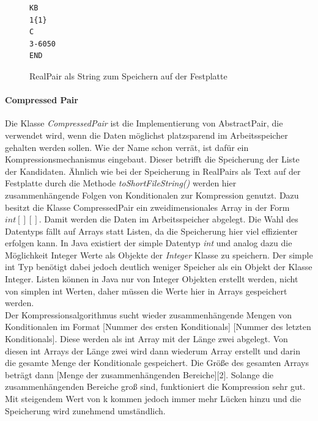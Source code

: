 \documentclass[12pt,a4paper]{article}
\begin{document}
\begin{figure}
\begin{lstlisting}
KB
1{1}
C
3-6050
END
\end{lstlisting}
\caption{RealPair als String zum Speichern auf der Festplatte}
\label{code:pair-text}
\end{figure} 




\paragraph{Compressed Pair}\mbox{}

Die Klasse \textit{CompressedPair} ist die Implementierung von AbstractPair, die verwendet wird, wenn die Daten möglichst platzsparend im Arbeitsspeicher gehalten werden sollen. Wie der Name schon verrät, ist dafür ein Kompressionsmechanismus eingebaut. Dieser betrifft die Speicherung der Liste der Kandidaten. Ähnlich wie bei der Speicherung in RealPairs als Text auf der Festplatte durch die Methode \textit{toShortFileString()} werden hier zusammenhängende Folgen von Konditionalen zur Kompression genutzt. Dazu besitzt die Klasse CompressedPair ein zweidimensionales Array in der Form $int[][]$. Damit werden die Daten im Arbeitsspeicher abgelegt. Die Wahl des Datentyps fällt auf Arrays statt Listen, da die Speicherung hier viel effizienter erfolgen kann. In Java existiert der simple Datentyp \textit{int} und analog dazu die Möglichkeit Integer Werte als Objekte der \textit{Integer} Klasse zu speichern. Der simple int Typ benötigt dabei jedoch deutlich weniger Speicher als ein Objekt der Klasse Integer. Listen können in Java nur von Integer Objekten erstellt werden, nicht von simplen int Werten, daher müssen die Werte hier in Arrays gespeichert werden.\\
Der Kompressionsalgorithmus sucht wieder zusammenhängende Mengen von Konditionalen im Format [Nummer des ersten Konditionals] [Nummer des letzten Konditionals]. Diese werden als int Array mit der Länge zwei abgelegt. Von diesen int Arrays der Länge zwei wird dann wiederum Array erstellt und darin die gesamte Menge der Konditionale gespeichert. Die Größe des gesamten Arrays beträgt dann [Menge der zusammenhängenden Bereiche][2]. Solange die zusammenhängenden Bereiche groß sind, funktioniert die Kompression sehr gut. Mit steigendem Wert von k kommen jedoch immer mehr Lücken hinzu und die Speicherung wird zunehmend umständlich. \\
\end{document}
